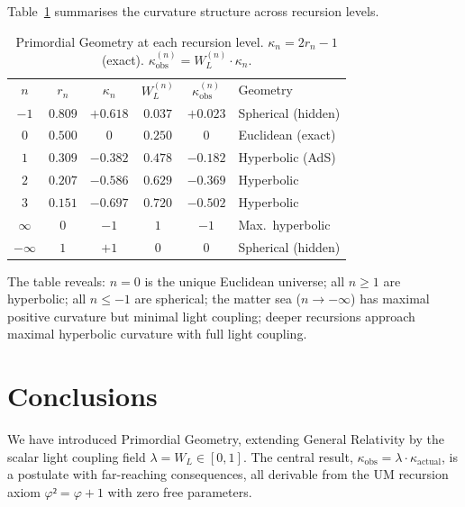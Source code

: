 \documentclass[prd,twocolumn,preprintnumbers,amsmath,amssymb]{revtex4-2}
\newcommand{\WL}{W_{L}}
\newcommand{\kact}{\kappa_{\mathrm{actual}}}
\newcommand{\kobs}{\kappa_{\mathrm{obs}}}
\begin{document}
Table~\ref{tab:geom} summarises the curvature structure across recursion levels.

\begin{table}[h]
\caption{Primordial Geometry at each recursion level.  $\kappa_n = 2r_n-1$ (exact).
$\kobs^{(n)}=\WL^{(n)}\cdot\kappa_n$.}
\label{tab:geom}
\begin{ruledtabular}
\begin{tabular}{cccccl}
$n$ & $r_n$ & $\kappa_n$ & $\WL^{(n)}$ & $\kobs^{(n)}$ & Geometry \\
\colrule
$-1$ & $0.809$ & $+0.618$ & $0.037$ & $+0.023$ & Spherical (hidden) \\
$0$  & $0.500$ & $0$       & $0.250$ & $0$       & Euclidean (exact)  \\
$1$  & $0.309$ & $-0.382$  & $0.478$ & $-0.182$  & Hyperbolic (AdS)   \\
$2$  & $0.207$ & $-0.586$  & $0.629$ & $-0.369$  & Hyperbolic         \\
$3$  & $0.151$ & $-0.697$  & $0.720$ & $-0.502$  & Hyperbolic         \\
$\infty$ & $0$ & $-1$     & $1$     & $-1$       & Max.\ hyperbolic   \\
$-\infty$& $1$ & $+1$     & $0$     & $0$        & Spherical (hidden) \\
\end{tabular}
\end{ruledtabular}
\end{table}

The table reveals: $n=0$ is the unique Euclidean universe; all $n\geq1$ are
hyperbolic; all $n\leq-1$ are spherical; the matter sea ($n\to-\infty$) has
maximal positive curvature but minimal light coupling; deeper recursions approach
maximal hyperbolic curvature with full light coupling.

\section{Conclusions}
\label{sec:conclusions}

We have introduced Primordial Geometry, extending General Relativity by the scalar
light coupling field $\lambda = \WL \in [0,1]$.  The central result,
$\kobs = \lambda\cdot\kact$, is a postulate with far-reaching consequences,
all derivable from the UM recursion axiom $φ² = φ + 1$ with zero free
parameters.
\end{document}
